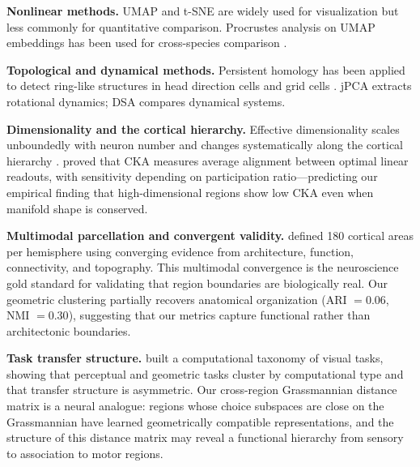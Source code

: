 \documentclass{article}
\begin{document}
\textbf{Nonlinear methods.} UMAP \citep{mcinnes2018umap} and t-SNE \citep{vandermaaten2008visualizing} are widely used for visualization but less commonly for quantitative comparison. Procrustes analysis on UMAP embeddings has been used for cross-species comparison \citep{deitch2021representational}.

\textbf{Topological and dynamical methods.} Persistent homology has been applied to detect ring-like structures in head direction cells \citep{gardner2022toroidal} and grid cells \citep{rybakken2019decoding}. jPCA \citep{churchland2012neural} extracts rotational dynamics; DSA \citep{ostrow2023beyond} compares dynamical systems.

\textbf{Dimensionality and the cortical hierarchy.} Effective dimensionality scales unboundedly with neuron number \citep{stringer2024unbounded} and changes systematically along the cortical hierarchy \citep{huntenburg2024categorical}. \citet{harvey2024representational} proved that CKA measures average alignment between optimal linear readouts, with sensitivity depending on participation ratio---predicting our empirical finding that high-dimensional regions show low CKA even when manifold shape is conserved.

\textbf{Multimodal parcellation and convergent validity.} \citet{glasser2016multi} defined 180 cortical areas per hemisphere using converging evidence from architecture, function, connectivity, and topography. This multimodal convergence is the neuroscience gold standard for validating that region boundaries are biologically real. Our geometric clustering partially recovers anatomical organization (ARI $= 0.06$, NMI $= 0.30$), suggesting that our metrics capture functional rather than architectonic boundaries.

\textbf{Task transfer structure.} \citet{zamir2018taskonomy} built a computational taxonomy of visual tasks, showing that perceptual and geometric tasks cluster by computational type and that transfer structure is asymmetric. Our cross-region Grassmannian distance matrix is a neural analogue: regions whose choice subspaces are close on the Grassmannian have learned geometrically compatible representations, and the structure of this distance matrix may reveal a functional hierarchy from sensory to association to motor regions.
\end{document}
